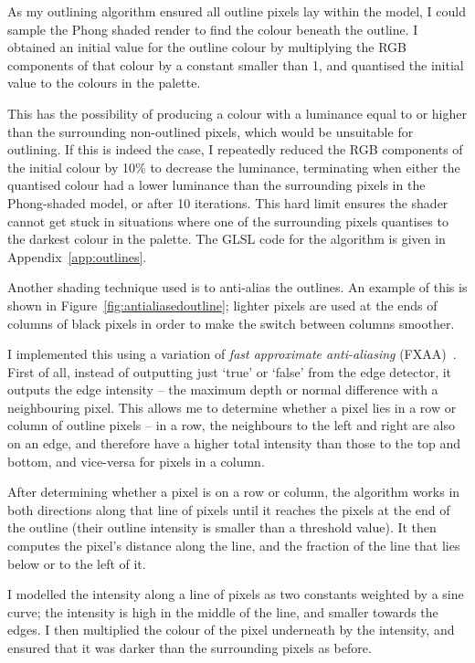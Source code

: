 \documentclass[12pt,twoside,notitlepage]{report}
\begin{document}
As my outlining algorithm ensured all outline pixels lay within the model, I could sample the Phong shaded render to find the colour beneath the outline. I obtained an initial value for the outline colour by multiplying the RGB components of that colour by a constant smaller than 1, and quantised the initial value to the colours in the palette.

This has the possibility of producing a colour with a luminance equal to or higher than the surrounding non-outlined pixels, which would be unsuitable for outlining. If this is indeed the case, I repeatedly reduced the RGB components of the initial colour by 10\% to decrease the luminance, terminating when either the quantised colour had a lower luminance than the surrounding pixels in the Phong-shaded model, or after 10 iterations. This hard limit ensures the shader cannot get stuck in situations where one of the surrounding pixels quantises to the darkest colour in the palette. The GLSL code for the algorithm is given in Appendix~\ref{app:outlines}.

Another shading technique used is to anti-alias the outlines. An example of this is shown in Figure~\ref{fig:antialiasedoutline}; lighter pixels are used at the ends of columns of black pixels in order to make the switch between columns smoother.

I implemented this using a variation of \textit{fast approximate anti-aliasing} (FXAA)~\cite{Lottes:2009}. First of all, instead of outputting just `true' or `false' from the edge detector, it outputs the edge intensity -- the maximum depth or normal difference with a neighbouring pixel. This allows me to determine whether a pixel lies in a row or column of outline pixels -- in a row, the neighbours to the left and right are also on an edge, and therefore have a higher total intensity than those to the top and bottom, and vice-versa for pixels in a column.

After determining whether a pixel is on a row or column, the algorithm works in both directions along that line of pixels until it reaches the pixels at the end of the outline (their outline intensity is smaller than a threshold value). It then computes the pixel's distance along the line, and the fraction of the line that lies below or to the left of it.

I modelled the intensity along a line of pixels as two constants weighted by a sine curve; the intensity is high in the middle of the line, and smaller towards the edges. I then multiplied the colour of the pixel underneath by the intensity, and ensured that it was darker than the surrounding pixels as before.
\end{document}
